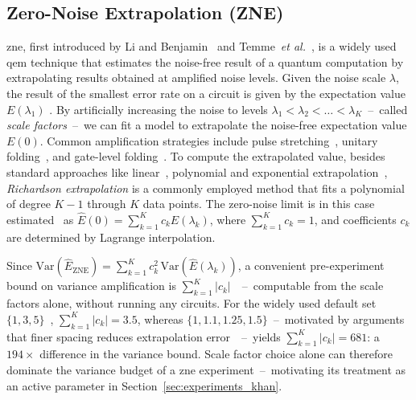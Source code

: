 \documentclass[10pt,conference]{IEEEtran}
\newcommand{\etal}{\emph{et al.}\xspace}
\begin{document}
\subsection{Zero-Noise Extrapolation (ZNE)}
\gls{zne}, first introduced by Li and Benjamin~\cite{li_efficient_2017} and Temme~\etal~\cite{temme_error_2017}, is a widely used \gls{qem} technique that estimates the noise-free result of a quantum computation by extrapolating results obtained at amplified noise levels. Given the noise scale $\lambda$, the result of the smallest error rate on a circuit is given by the expectation value $E(\lambda_1)$ \cite{cai_quantum_2023, majumdar_best_2023}. By artificially increasing the noise to levels $\lambda_1 < \lambda_2 < \dots < \lambda_K$~--~called \emph{scale factors}~--~we can fit a model to extrapolate the noise-free expectation value $E(0)$. Common amplification strategies include pulse stretching~\cite{temme_error_2017, kandala_error_2019}, unitary folding~\cite{giurgica-tiron_digital_2020}, and gate-level folding~\cite{hour_improving_2024}. To compute the extrapolated value, besides standard approaches like linear~\cite{li_efficient_2017}, polynomial and exponential extrapolation~\cite{endo_practical_2018, majumdar_best_2023}, \emph{Richardson extrapolation} is a commonly employed method \cite{temme_error_2017,endo_practical_2018, giurgica-tiron_digital_2020, krebsbach_optimization_2022} that fits a polynomial of degree $K-1$ through $K$ data points. The zero-noise limit is in this case estimated~\cite{cai_quantum_2023} as \(\hat{E}(0) = \sum_{k=1}^K c_k E(\lambda_k)\), where \(\sum_{k=1}^K c_k = 1\), and coefficients $c_k$ are determined by Lagrange interpolation.

Since $\text{Var}(\hat{E}_\text{ZNE}) = \sum_{k=1}^K c_k^2 \, \text{Var}(\hat{E}(\lambda_k))$, a convenient pre-experiment bound on variance amplification is $\sum_{k=1}^{K}|c_k|$~\cite{cai_quantum_2023, krebsbach_optimization_2022}~--~computable from the scale factors alone, without running any circuits. For the widely used default set $\{1, 3, 5\}$~\cite{giurgica-tiron_digital_2020, majumdar_best_2023}, $\sum_{k=1}^K|c_k| = 3.5$, whereas $\{1, 1.1, 1.25, 1.5\}$~--~motivated by arguments that finer spacing reduces extrapolation error~\cite{krebsbach_optimization_2022}~--~yields $\sum_{k=1}^K|c_k| = 681$: a $194\times$ difference in the variance bound. Scale factor choice alone can therefore dominate the variance budget of a \gls{zne} experiment~--~motivating its treatment as an active parameter in Section~\ref{sec:experiments_khan}.
\end{document}
